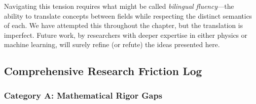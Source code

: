 \documentclass[
  journal=largetwo,
  year=2025,
  volume=37,
]{cup-journal}
\begin{document}
Navigating this tension requires what might be called \textit{bilingual fluency}---the ability to translate concepts between fields while respecting the distinct semantics of each. We have attempted this throughout the chapter, but the translation is imperfect. Future work, by researchers with deeper expertise in either physics or machine learning, will surely refine (or refute) the ideas presented here.

\subsection{Comprehensive Research Friction Log}\label{sec:friction_log}


\subsubsection{Category A: Mathematical Rigor Gaps}
\end{document}
